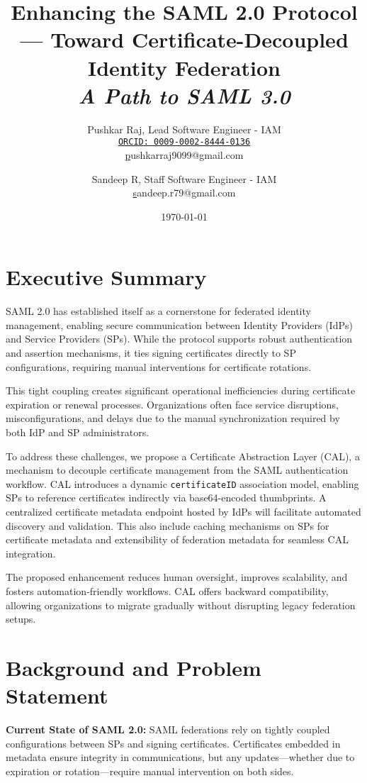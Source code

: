 \documentclass{article}
\title{Enhancing the SAML 2.0 Protocol — Toward Certificate-Decoupled Identity Federation\\ \textit{A Path to SAML 3.0}}
\author{
Pushkar Raj, Lead Software Engineer - IAM \\ 
\href{https://orcid.org/0009-0002-8444-0136}{\texttt{ORCID: 0009-0002-8444-0136}} \\
\href{mailto:pushkarraj9099@gmail.com}pushkarraj9099@gmail.com
\and
Sandeep R, Staff Software Engineer - IAM \\ 
\href{mailto:sandeep.r79@gmail.com}sandeep.r79@gmail.com
}
\date{\today}
\begin{document}
\maketitle

\section*{Executive Summary}
SAML 2.0 has established itself as a cornerstone for federated identity management, enabling secure communication between Identity Providers (IdPs) and Service Providers (SPs). While the protocol supports robust authentication and assertion mechanisms, it ties signing certificates directly to SP configurations, requiring manual interventions for certificate rotations.

This tight coupling creates significant operational inefficiencies during certificate expiration or renewal processes. Organizations often face service disruptions, misconfigurations, and delays due to the manual synchronization required by both IdP and SP administrators.

To address these challenges, we propose a Certificate Abstraction Layer (CAL), a mechanism to decouple certificate management from the SAML authentication workflow. CAL introduces a dynamic \texttt{certificateID} association model, enabling SPs to reference certificates indirectly via base64-encoded thumbprints. A centralized certificate metadata endpoint hosted by IdPs will facilitate automated discovery and validation. This also include caching mechanisms on SPs for certificate metadata and extensibility of federation metadata for seamless CAL integration.

The proposed enhancement reduces human oversight, improves scalability, and fosters automation-friendly workflows. CAL offers backward compatibility, allowing organizations to migrate gradually without disrupting legacy federation setups.

\section*{Background and Problem Statement}
\textbf{Current State of SAML 2.0:}  
SAML federations rely on tightly coupled configurations between SPs and signing certificates. Certificates embedded in metadata ensure integrity in communications, but any updates—whether due to expiration or rotation—require manual intervention on both sides.
\end{document}
